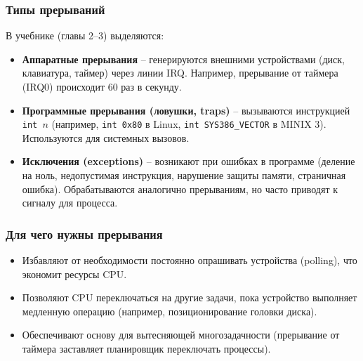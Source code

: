 \documentclass[a4paper,12pt]{article}
\begin{document}
\subsubsection{Типы прерываний}
В учебнике (главы 2–3) выделяются:
\begin{itemize}
    \item \textbf{Аппаратные прерывания} – генерируются внешними устройствами (диск, клавиатура, таймер) через линии IRQ. Например, прерывание от таймера (IRQ0) происходит 60 раз в секунду.
    \item \textbf{Программные прерывания (ловушки, traps)} – вызываются инструкцией \texttt{int $n$} (например, \texttt{int 0x80} в Linux, \texttt{int SYS386\_VECTOR} в MINIX 3). Используются для системных вызовов.
    \item \textbf{Исключения (exceptions)} – возникают при ошибках в программе (деление на ноль, недопустимая инструкция, нарушение защиты памяти, страничная ошибка). Обрабатываются аналогично прерываниям, но часто приводят к сигналу для процесса.
\end{itemize}

\subsubsection{Для чего нужны прерывания}
\begin{itemize}
    \item Избавляют от необходимости постоянно опрашивать устройства (polling), что экономит ресурсы CPU.
    \item Позволяют CPU переключаться на другие задачи, пока устройство выполняет медленную операцию (например, позиционирование головки диска).
    \item Обеспечивают основу для вытесняющей многозадачности (прерывание от таймера заставляет планировщик переключать процессы).
\end{itemize}
\end{document}
